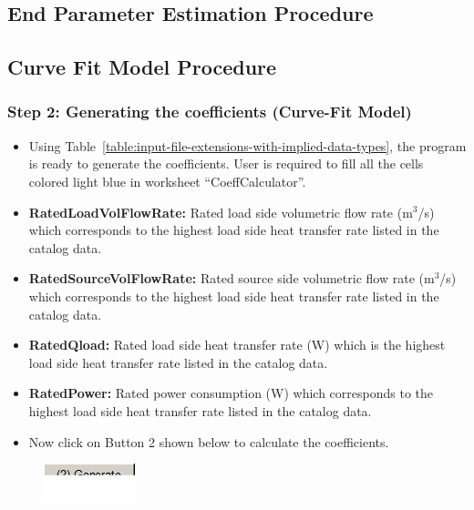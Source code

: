 \subsection{End Parameter Estimation Procedure}\label{end-parameter-estimation-procedure-001}

\subsection{Curve Fit Model Procedure}\label{curve-fit-model-procedure-001}

\subsubsection{Step 2: Generating the coefficients (Curve-Fit Model)}\label{step-2-generating-the-coefficients-curve-fit-model-001}

\begin{itemize}
\item
  Using Table~\ref{table:input-file-extensions-with-implied-data-types}, the program is ready to generate the coefficients. User is required to fill all the cells colored light blue in worksheet ``CoeffCalculator''.
\item
  \textbf{RatedLoadVolFlowRate:} Rated load side volumetric flow rate (m\(^{3}\)/s) which corresponds to the highest load side heat transfer rate listed in the catalog data.
\item
  \textbf{RatedSourceVolFlowRate:} Rated source side volumetric flow rate (m\(^{3}\)/s) which corresponds to the highest load side heat transfer rate listed in the catalog data.
\item
  \textbf{RatedQload:} Rated load side heat transfer rate (W) which is the highest load side heat transfer rate listed in the catalog data.
\item
  \textbf{RatedPower:} Rated power consumption (W) which corresponds to the highest load side heat transfer rate listed in the catalog data.
\item
  Now click on Button 2 shown below to calculate the coefficients.
\end{itemize}

\begin{figure}[htbp]
\centering
\includegraphics{media/image044.png}
\caption{}
\end{figure}

